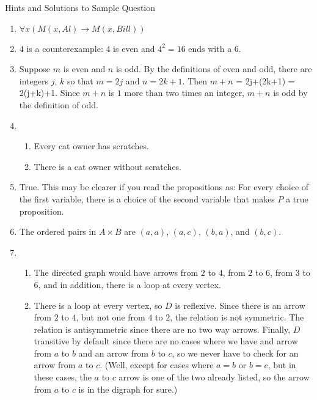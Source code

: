 \begin{center}Hints and Solutions to Sample Question\end{center}
\begin{enumerate}

\medskip

\item $\forall{x}(M(x,Al)\longrightarrow M(x,Bill))$

\medskip

\item $4$ is a counterexample: $4$ is even and $4^2 = 16$ ends with a $6$.

\medskip

\item Suppose $m$ is even and $n$ is odd. By the definitions of even and odd, there are integers $j$, $k$ so that $m= 2j$ and $n = 2k+1$.  Then $m+n$ = 2j+(2k+1) = 2(j+k)+1. Since $m+n$ is $1$ more than
two times an integer, $m+n$ is odd by the definition of odd.

\medskip


\item 

\begin{enumerate}
\item Every cat owner has scratches.

\item There is a cat owner without scratches. 
\end{enumerate}

\medskip


\item True. This may be clearer if you read the propositions as: For every choice of the first variable, there is a choice of the second variable that makes $P$ a true proposition.

\medskip


\item The ordered pairs in $A\times B$ are $(a,a)$, $(a,c)$, $(b,a)$, and $(b,c)$.

\medskip


\item 
\begin{enumerate}
\item The directed graph would have arrows from $2$ to $4$, from $2$ to $6$, from $3$ to $6$, and
in addition, there is a loop at every vertex.

\item There is a loop at every vertex, so $D$ is reflexive. Since there is an arrow from $2$ to $4$, but not one from $4$ to $2$, the relation is not symmetric. The relation is antisymmetric since there are no two way
arrows. Finally, $D$ transitive by default since there are no cases where we have and arrow from 
$a$ to $b$ and an arrow from $b$ to $c$, so we never have to check for an arrow from $a$ to $c$.
(Well, except for cases where  $a=b$ or $b=c$, but in these cases, the $a$ to $c$ arrow is one of the
two already listed, so the arrow from $a$ to $c$ is in the digraph for sure.)
\end{enumerate}
\medskip



\end{enumerate}

